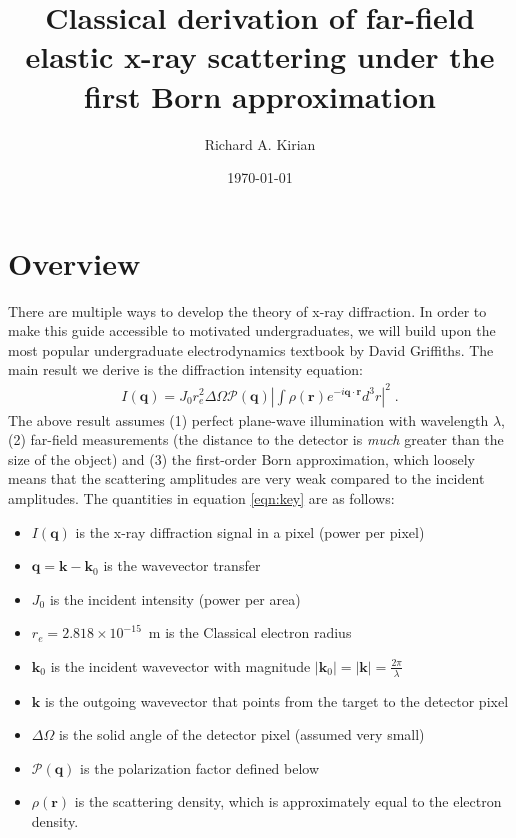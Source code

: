 \documentclass[12pt]{article}
\title{Classical derivation of far-field elastic x-ray scattering under the first Born approximation}
\author{Richard A. Kirian}
\date{\today}
\renewcommand{\vec}[1]{\boldsymbol{#1}}
\newcommand{\abs}[1]{\left| #1 \right|}
\begin{document}
\maketitle

\section{Overview}

There are multiple ways to develop the theory of x-ray diffraction.  In order to make this guide 
accessible to motivated undergraduates, we will build upon the most popular
undergraduate electrodynamics textbook by David Griffiths\cite{Griffiths2018}.  The main result we derive is
the diffraction intensity equation:
\begin{align}\label{eqn:key}
    I(\vec{q}) = J_0 r_e^2 \Delta \Omega \mathcal{P}(\vec{q})  \abs{\int  
\rho(\vec{r}) e^{-i \vec{q}\cdot\vec{r}} d^3 r }^2 \;.
\end{align}
The above result assumes (1) perfect plane-wave illumination with wavelength $\lambda$, (2) far-field measurements (the
distance to the detector is \emph{much} greater than the size of the object)
and (3) the first-order Born approximation, which loosely means that the scattering amplitudes are very weak
compared to the incident amplitudes. The quantities in equation \ref{eqn:key} are as follows:
\begin{itemize}
\item $I(\vec{q})$ is the x-ray diffraction signal in a pixel (power per 
pixel)
\item $\vec{q}=\vec{k}-\vec{k}_0$ is the wavevector transfer
\item $J_0$ is the incident intensity (power per area)
\item $r_e = 2.818 \times 10^{-15}$~m is the Classical electron radius
\item $\vec{k}_0$ is the incident wavevector with magnitude $|\vec{k}_0| = 
|\vec{k}| = \frac{2\pi}{\lambda}$
\item $\vec{k}$ is the outgoing wavevector that points from the target to the detector pixel
\item $\Delta \Omega$ is the solid angle of the detector pixel (assumed very 
small)
\item $\mathcal{P}(\vec{q})$ is the polarization factor defined below
\item $\rho(\vec{r})$ is the scattering density, which is approximately equal to 
the electron density.
\end{itemize}
\end{document}
